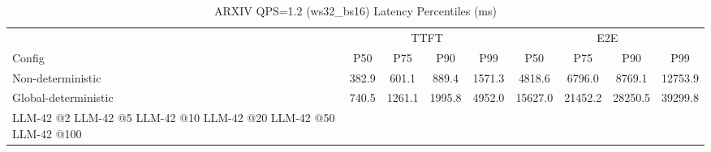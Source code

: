 \begin{table}[htbp]
\centering
\caption{ARXIV QPS=1.2 (ws32_bs16) Latency Percentiles (ms)}
\label{tab:arxiv_qps1.2_ws32_bs16}
\begin{tabular}{l|cccc|cccc}
\toprule
& \multicolumn{4}{c|}{TTFT} & \multicolumn{4}{c}{E2E} \\
Config & P50 & P75 & P90 & P99 & P50 & P75 & P90 & P99 \\
\midrule
Non-deterministic & 382.9 & 601.1 & 889.4 & 1571.3 & 4818.6 & 6796.0 & 8769.1 & 12753.9 \\
Global-deterministic & 740.5 & 1261.1 & 1995.8 & 4952.0 & 15627.0 & 21452.2 & 28250.5 & 39299.8 \\
LLM-42 @2%
LLM-42 @5%
LLM-42 @10%
LLM-42 @20%
LLM-42 @50%
LLM-42 @100%
\bottomrule
\end{tabular}
\end{table}
